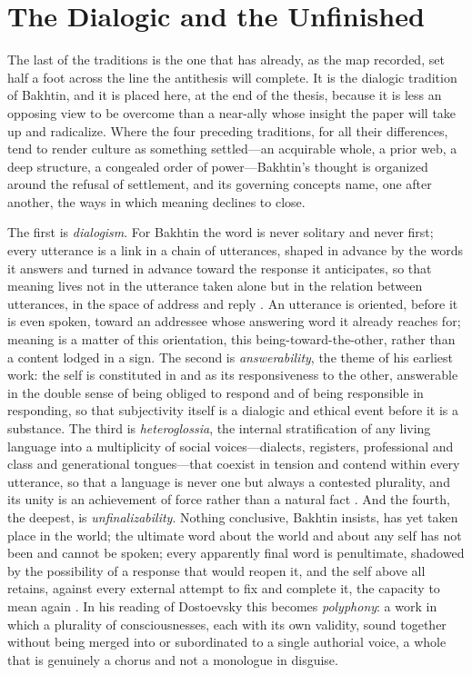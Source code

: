\section{The Dialogic and the Unfinished}
\label{p24:sec:dialogic}

\noindent
The last of the traditions is the one that has already, as the map recorded, set half a foot across the line the antithesis will complete. It is the dialogic tradition of Bakhtin, and it is placed here, at the end of the thesis, because it is less an opposing view to be overcome than a near-ally whose insight the paper will take up and radicalize. Where the four preceding traditions, for all their differences, tend to render culture as something settled---an acquirable whole, a prior web, a deep structure, a congealed order of power---Bakhtin's thought is organized around the refusal of settlement, and its governing concepts name, one after another, the ways in which meaning declines to close.

The first is \emph{dialogism}. For Bakhtin the word is never solitary and never first; every utterance is a link in a chain of utterances, shaped in advance by the words it answers and turned in advance toward the response it anticipates, so that meaning lives not in the utterance taken alone but in the relation between utterances, in the space of address and reply \parencite{bakhtin1981}. An utterance is oriented, before it is even spoken, toward an addressee whose answering word it already reaches for; meaning is a matter of this orientation, this being-toward-the-other, rather than a content lodged in a sign. The second is \emph{answerability}, the theme of his earliest work: the self is constituted in and as its responsiveness to the other, answerable in the double sense of being obliged to respond and of being responsible in responding, so that subjectivity itself is a dialogic and ethical event before it is a substance. The third is \emph{heteroglossia}, the internal stratification of any living language into a multiplicity of social voices---dialects, registers, professional and class and generational tongues---that coexist in tension and contend within every utterance, so that a language is never one but always a contested plurality, and its unity is an achievement of force rather than a natural fact \parencite{bakhtin1981}. And the fourth, the deepest, is \emph{unfinalizability}. Nothing conclusive, Bakhtin insists, has yet taken place in the world; the ultimate word about the world and about any self has not been and cannot be spoken; every apparently final word is penultimate, shadowed by the possibility of a response that would reopen it, and the self above all retains, against every external attempt to fix and complete it, the capacity to mean again \parencite{bakhtin1984poetics}. In his reading of Dostoevsky this becomes \emph{polyphony}: a work in which a plurality of consciousnesses, each with its own validity, sound together without being merged into or subordinated to a single authorial voice, a whole that is genuinely a chorus and not a monologue in disguise.

